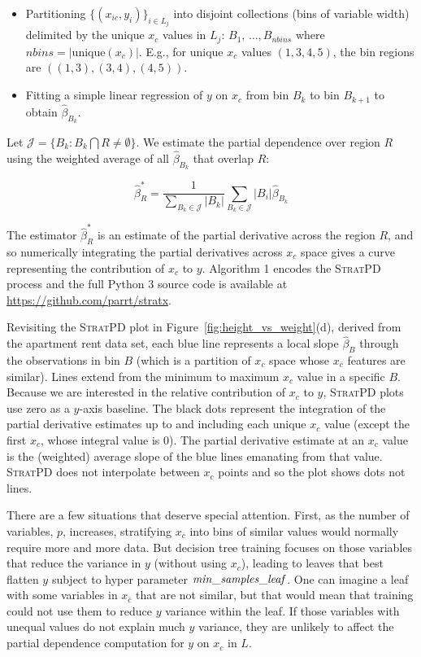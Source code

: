 \documentclass[12pt]{article}
\newcommand{\figref}[1]{Figure~\ref{#1}}
\newcommand{\spd}{\fontfamily{cmr}\textsc{\small StratPD}}
\newcommand{\xnc}{$x_{\overline{c}}$}
\begin{document}
\begin{itemize}
	\item Partitioning $\{(x_{ic}, y_i)\}_{i \in L_j}$ into disjoint collections (bins of variable width) delimited by the unique $x_c$ values in $L_j$: $B_1, \,\ldots, B_{nbins}$  where $nbins = |\text{unique}(x_c)|$. E.g., for unique $x_c$ values $(1,3,4,5)$, the bin regions are $((1,3), (3,4), (4,5))$.
	\item Fitting a simple linear regression of $y$ on $x_c$ from bin $B_k$ to bin $B_{k+1}$ to obtain  $\widehat{\beta}_{B_k}$.
\end{itemize}

Let $\mathcal{J} = \{B_k: B_k \bigcap R \neq \emptyset\}$. We estimate the partial dependence over region $R$ using the weighted average of all $\widehat{\beta}_{B_k}$ that overlap $R$:

\begin{equation}\label{eq:slope}
\widehat{\beta}^{*}_R = \frac{1}{\displaystyle\sum_{B_k \in \mathcal{J}} |B_k|}\displaystyle\sum_{B_k \in \mathcal{J}}|B_i|\widehat{\beta}_{B_k}
\end{equation}

The estimator $\widehat{\beta}^{*}_R$ is an estimate of the partial derivative across the region $R$, and so numerically integrating the partial derivatives across $x_c$ space gives a curve representing the contribution of $x_c$ to $y$.  Algorithm 1 encodes the \spd{} process and the full Python 3 source code is available at {\small \url{https://github.com/parrt/stratx}}. 

Revisiting the \spd{} plot in \figref{fig:height_vs_weight}(d), derived from the apartment rent data set, each blue line represents a local slope $\hat{\beta}_B$ through the observations in bin $B$ (which is a partition of $x_c$ space whose \xnc{} features are similar). Lines extend from the minimum to maximum $x_c$ value in a specific $B$.  Because we are interested in the relative contribution of $x_c$ to $y$, \spd{} plots use zero as a $y$-axis baseline. The black dots represent the integration of the partial derivative estimates up to and including each unique $x_c$ value (except the first $x_c$, whose integral value is 0). The partial derivative estimate at an $x_c$ value is the (weighted) average slope of the blue lines emanating from that value. \spd{} does not interpolate between $x_c$ points and so the plot shows dots not lines. 

There are a few situations that deserve special attention. First, as the number of  variables, $p$, increases, stratifying \xnc{} into bins of similar values would normally require more and more data. But decision tree training focuses on those variables that reduce the variance in $y$ (without using $x_c$), leading to leaves that best flatten $y$ subject to hyper parameter ${\it min\_samples\_leaf}$. One can imagine a leaf with some variables in \xnc{} that are not similar, but that would mean that training could not use them to reduce $y$ variance within the leaf. If those variables with unequal values do not explain much $y$ variance, they are unlikely to affect the partial dependence computation for $y$ on $x_c$ in $L$.
\end{document}
